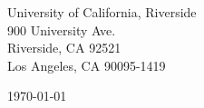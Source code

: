 \begin{minipage}{0.49\textwidth}
\begin{flushleft}
\noindent 
University of California, Riverside\\
900 University Ave.\\
Riverside, CA 92521\\
Los Angeles, CA 90095-1419
\end{flushleft}
\end{minipage}
\begin{minipage}{0.47\textwidth}
\begin{flushright}
\today
\end{flushright}
\end{minipage} \\

\newcommand{\univ}{University of California, Riverside}
\newcommand{\univshort}{UC Riverside}
\newcommand{\degree}{Ph.D.}
\newcommand{\dept}{Computer Science}

